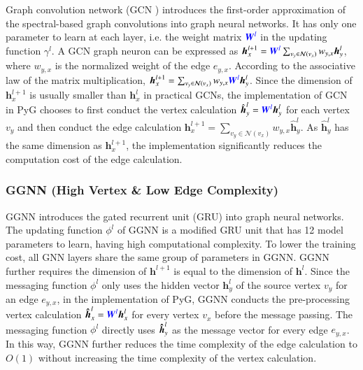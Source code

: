 Graph convolution network (GCN \cite{kipf2017_gcn}) introduces the first-order approximation of the spectral-based graph convolutions into graph neural networks.
%
It has only one parameter to learn at each layer, i.e. the weight matrix $\textcolor{blue}{\boldsymbol{W}^l}$ in the updating function $\gamma^l$.
%
A GCN graph neuron can be expressed as $\boldsymbol{h}^{l+1}_x = \textcolor{blue}{\boldsymbol{W}^l}\sum_{v_y \in \mathcal{N}(v_x)}{w_{y,x}\boldsymbol{h}^l_y}$, where $w_{y,x}$ is the normalized weight of the edge $e_{y,x}$.
%
According to the associative law of the matrix multiplication, $\boldsymbol{h}^{l+1}_x = \sum_{v_y \in \mathcal{N}(v_x)}{w_{y,x}\textcolor{blue}{\boldsymbol{W}^l}\boldsymbol{h}^l_y}$.
%
Since the dimension of $\boldsymbol{h}^{l+1}_x$ is usually smaller than $\boldsymbol{h}^l_x$ in practical GCNs, the implementation of GCN in PyG chooses to first conduct the vertex calculation $\hat{\boldsymbol{h}}^l_y = \textcolor{blue}{\boldsymbol{W}^l}\boldsymbol{h}^l_y$ for each vertex $v_y$ and then conduct the edge calculation $\boldsymbol{h}^{l+1}_x=\sum_{v_y\in\mathcal{N}(v_x)}{w_{y,x}\hat{\boldsymbol{h}}^l_y}$.
%
As $\hat{\boldsymbol{h}}^l_y$ has the same dimension as $\boldsymbol{h}^{l+1}_x$, the implementation significantly reduces the  computation cost of the edge calculation.

\subsubsection{GGNN (High Vertex \& Low Edge Complexity)}

GGNN \cite{li2015_ggnn} introduces the gated recurrent unit (GRU) into graph neural networks.
%
The updating function $\phi^l$ of GGNN is a modified GRU unit that has 12 model parameters to learn, having high computational complexity.
%
To lower the training cost, all GNN layers share the same group of parameters in GGNN.
%
GGNN further requires the dimension of $\boldsymbol{h}^{l+1}$ is equal to the dimension of $\boldsymbol{h}^l$.
%
Since the messaging function $\phi^l$ only uses the hidden vector $\boldsymbol{h}^l_y$ of the source vertex $v_y$ for an edge $e_{y,x}$, in the implementation of PyG, GGNN conducts the pre-processing vertex calculation $\boldsymbol{\hat{h}}^l_x = \textcolor{blue}{\boldsymbol{W}^l}\boldsymbol{h}^l_x$ for every vertex $v_x$ before the message passing.
%
The messaging function $\phi^l$ directly uses $\boldsymbol{\hat{h}}^l_y$ as the message vector for every edge $e_{y, x}$.
%
In this way, GGNN further reduces the time complexity of the edge calculation to $O(1)$ without increasing the time complexity of the vertex calculation.


